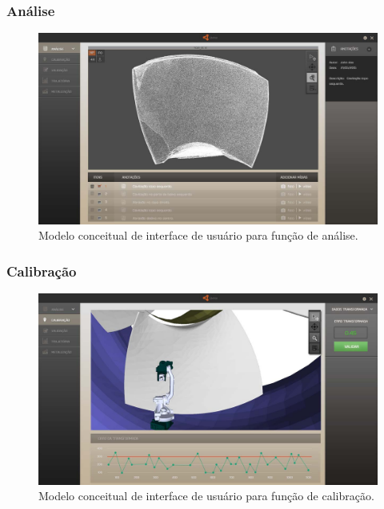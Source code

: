 \documentclass[12pt,a4paper]{article}
\begin{document}
\subsubsection {Análise}

\begin{figure}[H]
\begin{center}
  \includegraphics[width=.95\columnwidth]{figs/Analise.jpg}
  \caption{Modelo conceitual de interface de usuário para função de análise.}
  \label{fig:Interface de usuário para função de análise.}
\end{center}
\end{figure} 

\subsubsection {Calibração}

\begin{figure}[H]
\begin{center}
  \includegraphics[width=.95\columnwidth]{figs/Calibracao.jpg}
  \caption{Modelo conceitual de interface de usuário para função de calibração.}
  \label{fig:Interface de usuário para função de calibração.}
\end{center}
\end{figure} 
\end{document}
